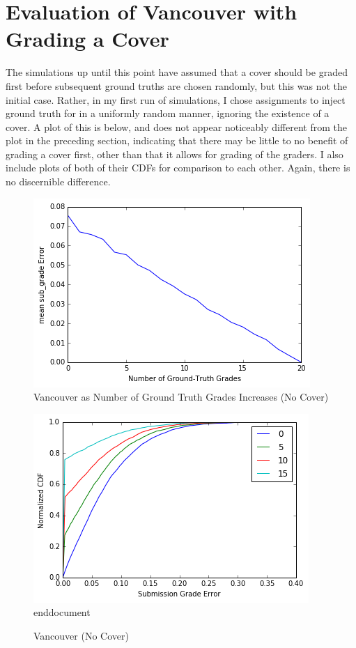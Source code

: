 \documentclass{article}
\begin{document}
	\section{Evaluation of Vancouver with Grading a Cover}
	The simulations up until this point have assumed that a cover should be graded first before subsequent ground truths are chosen randomly, but this was not the initial case. Rather, in my first run of simulations, I chose assignments to inject ground truth for in a uniformly random manner, ignoring the existence of a cover. A plot of this is below, and does not appear noticeably different from the plot in the preceding section, indicating that there may be little to no benefit of grading a cover first, other than that it allows for grading of the graders. I also include plots of both of their CDFs for comparison to each other. Again, there is no discernible difference.
	
	\begin{figure}[h]
		\includegraphics{vancouver-vs-ground-truth-no-cover.png}
		\caption{Vancouver as Number of Ground Truth Grades Increases (No Cover)}
	\end{figure}
	
	\begin{figure}[h]
		\includegraphics{vancouver-no-cover.png}end{document}
		\caption{Vancouver (No Cover)}
	\end{figure}
	
\end{document}

